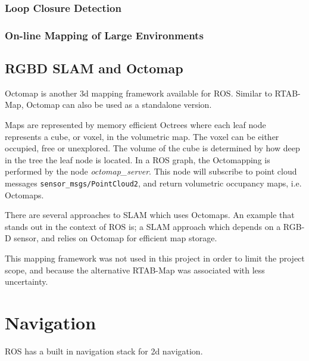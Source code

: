 \subsubsection{Loop Closure Detection}

\subsubsection{On-line Mapping of Large Environments}



\subsection{RGBD SLAM and Octomap}

Octomap\cite{hornung13auro} is another 3d mapping framework available for \ac{ROS}. Similar to \ac{RTAB-Map}, Octomap can also be used as a standalone version. 

Maps are represented by memory efficient Octrees where each leaf node represents a cube, or voxel, in the volumetric map. The voxel can be either occupied, free or unexplored. The volume of the cube is determined by how deep in the tree the leaf node is located. In a \ac{ROS} graph, the Octomapping is performed by the node \textit{octomap\_server}. This node  will subscribe to point cloud messages \texttt{sensor\_msgs/PointCloud2}, and return volumetric occupancy maps, i.e. Octomaps.

There are several approaches to \ac{SLAM}  which uses Octomaps. An example that stands out in the context of \ac{ROS} is\cite{endres20143}; a \ac{SLAM} approach which depends on a RGB-D sensor, and relies on Octomap for efficient map storage.

This mapping framework was not used in this project in order to limit the project scope, and because the alternative \ac{RTAB-Map} was associated with less uncertainty.

\section{Navigation}

\ac{ROS} has a built in navigation stack for 2d navigation. 
